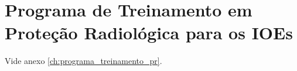 \chapter{Programa de Treinamento em Proteção Radiológica para os IOEs}
Vide anexo \ref{ch:programa_treinamento_pr}.